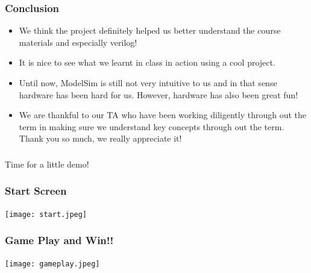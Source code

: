 \documentclass{beamer}
\begin{document}
\begin{frame}
    \frametitle{Conclusion}
    \begin{itemize}
        \item We think the project definitely helped us better understand the course materials and especially verilog!
        \item It is nice to see what we learnt in class in action using a cool project. 
        \item Until now, ModelSim is still not very intuitive to us and in that sense hardware has been hard for us. However, hardware has also been great fun!
        \item We are thankful to our TA who have been working diligently through out the term in making sure we understand key concepts through out the term. Thank you so much, we really appreciate it!
    \end{itemize}
\end{frame}

\begin{frame}
    \frametitle{}
    \center \LARGE Time for a little demo!
\end{frame}


\begin{frame}
    \frametitle{Start Screen}
    \center
    \texttt{[image: start.jpeg]}
\end{frame}

\begin{frame}
    \frametitle{Game Play and Win!!}
    \center
    \texttt{[image: gameplay.jpeg]}
\end{frame}
\end{document}

